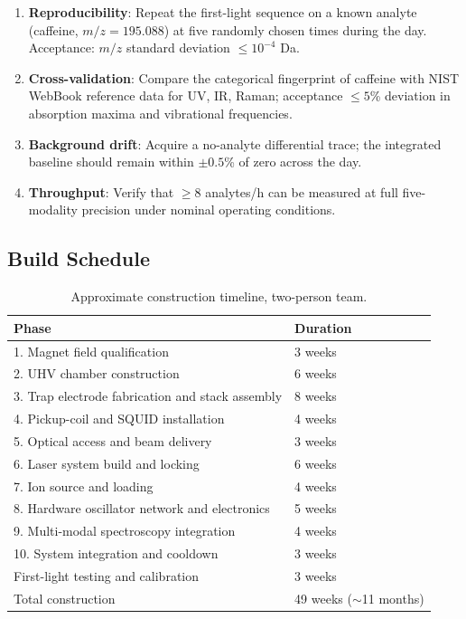 \begin{enumerate}[leftmargin=1.5em,nosep]
    \item \textbf{Reproducibility}: Repeat the first-light sequence on a known analyte (caffeine, $m/z = 195.088$) at five randomly chosen times during the day. Acceptance: $m/z$ standard deviation $\le 10^{-4}$ Da.
    \item \textbf{Cross-validation}: Compare the categorical fingerprint of caffeine with NIST WebBook reference data for UV, IR, Raman; acceptance $\le 5$\% deviation in absorption maxima and vibrational frequencies.
    \item \textbf{Background drift}: Acquire a no-analyte differential trace; the integrated baseline should remain within $\pm 0.5$\% of zero across the day.
    \item \textbf{Throughput}: Verify that $\ge 8$ analytes/h can be measured at full five-modality precision under nominal operating conditions.
\end{enumerate}

\subsection{Build Schedule}
\label{subsec:schedule}

\begin{table}[H]
\centering
\small
\caption{Approximate construction timeline, two-person team.}
\label{tab:build_schedule}
\begin{tabular}{p{}p{}}
\toprule
\textbf{Phase} & \textbf{Duration} \\
\midrule
1. Magnet field qualification & 3 weeks \\
2. UHV chamber construction & 6 weeks \\
3. Trap electrode fabrication and stack assembly & 8 weeks \\
4. Pickup-coil and SQUID installation & 4 weeks \\
5. Optical access and beam delivery & 3 weeks \\
6. Laser system build and locking & 6 weeks \\
7. Ion source and loading & 4 weeks \\
8. Hardware oscillator network and electronics & 5 weeks \\
9. Multi-modal spectroscopy integration & 4 weeks \\
10. System integration and cooldown & 3 weeks \\
First-light testing and calibration & 3 weeks \\
\midrule
Total construction & 49 weeks ($\sim$11 months) \\
\bottomrule
\end{tabular}
\end{table}


